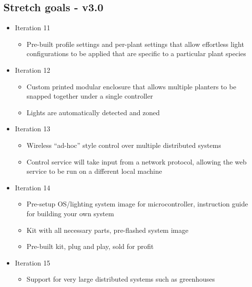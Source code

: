\documentclass[onecolumn, draftclsnofoot,10pt, compsoc]{IEEEtran}
\begin{document}
		\subsection{Stretch goals - v3.0}
			\begin{itemize}
				\item Iteration 11
					\begin{itemize}
						\item Pre-built profile settings and per-plant settings that allow effortless light configurations to be applied that are specific to a particular plant species
					\end{itemize}
				\item Iteration 12
					\begin{itemize}
						\item Custom printed modular enclosure that allows multiple planters to be snapped together under a single controller
						\item Lights are automatically detected and zoned
					\end{itemize}
				\item Iteration 13
					\begin{itemize}
						\item Wireless “ad-hoc” style control over multiple distributed systems
						\item Control service will take input from a network protocol, allowing the web service to be run on a different local machine
					\end{itemize}
				\item Iteration 14
					\begin{itemize}
						\item Pre-setup OS/lighting system image for microcontroller, instruction guide for building your own system
						\item Kit with all necessary parts, pre-flashed system image
						\item Pre-built kit, plug and play, sold for profit
					\end{itemize}
				\item Iteration 15
					\begin{itemize}
						\item Support for very large distributed systems such as greenhouses
					\end{itemize}
			\end{itemize}
\end{document}
